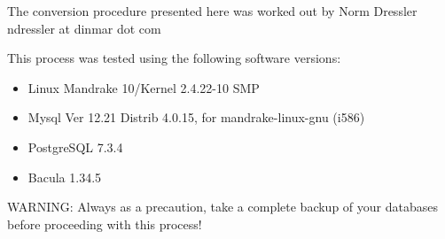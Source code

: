 The conversion procedure presented here was worked out by Norm Dressler
\lt{}ndressler at dinmar dot com\gt{} 

This process was tested using the following software versions: 

\begin{itemize}
\item Linux Mandrake 10/Kernel 2.4.22-10 SMP 
\item Mysql Ver 12.21 Distrib 4.0.15, for mandrake-linux-gnu (i586) 
\item PostgreSQL 7.3.4 
\item Bacula 1.34.5 
   \end{itemize}

WARNING: Always as a precaution, take a complete backup of your databases
before proceeding with this process! 


